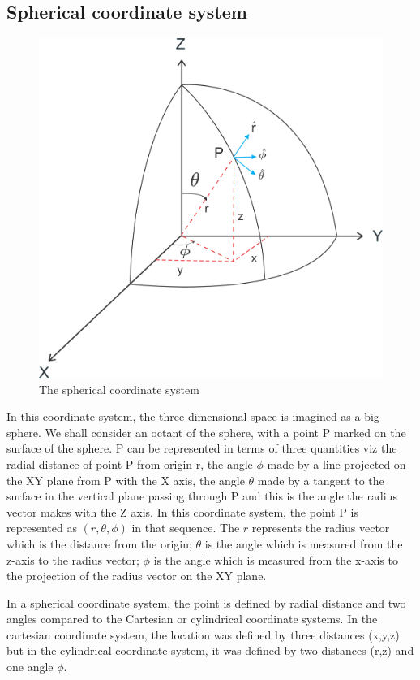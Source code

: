 \subsection{Spherical coordinate system}
\begin{figure}[h]
\centering
\includegraphics[width=1\linewidth]{graphics/spherical1}
\caption{The spherical  coordinate system}
\end{figure}

In this coordinate system, the three-dimensional space is imagined as a big sphere. We shall consider an octant of the sphere, with a point P marked on the surface of the sphere. P can be represented in terms of three quantities viz the radial distance of point P from origin r, the angle $\phi$ made by a line projected on the XY plane from P with the X axis, the angle $\theta$ made by a tangent to the surface in the vertical plane passing through P and this is the angle the radius vector makes with the Z axis. In this coordinate system, the point P is represented as $(r,\theta, \phi)$ in that sequence. The $r$ represents the radius vector which is the distance from the origin; $\theta$ is the angle which is measured from the z-axis to the radius vector; $\phi$ is the angle which is measured from the x-axis to the projection of the radius vector on the XY plane.

In a spherical coordinate system, the point is defined by radial distance and two angles compared to the Cartesian or cylindrical coordinate systems. In the cartesian coordinate system, the location was defined by three distances (x,y,z) but in the cylindrical coordinate system, it was defined by two distances (r,z) and one angle $\phi$.

